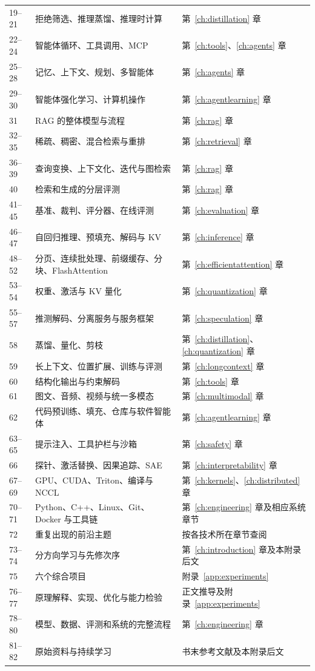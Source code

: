 \begin{longtable}{L{0.12\textwidth}L{0.45\textwidth}L{0.31\textwidth}}
19--21 & 拒绝筛选、推理蒸馏、推理时计算 & 第~\ref{ch:distillation} 章 \\
22--24 & 智能体循环、工具调用、MCP & 第~\ref{ch:tools}、\ref{ch:agents} 章 \\
25--28 & 记忆、上下文、规划、多智能体 & 第~\ref{ch:agents} 章 \\
29--30 & 智能体强化学习、计算机操作 & 第~\ref{ch:agentlearning} 章 \\
31 & RAG 的整体模型与流程 & 第~\ref{ch:rag} 章 \\
32--35 & 稀疏、稠密、混合检索与重排 & 第~\ref{ch:retrieval} 章 \\
36--39 & 查询变换、上下文化、迭代与图检索 & 第~\ref{ch:rag} 章 \\
40 & 检索和生成的分层评测 & 第~\ref{ch:rag} 章 \\
41--45 & 基准、裁判、评分器、在线评测 & 第~\ref{ch:evaluation} 章 \\
46--47 & 自回归推理、预填充、解码与 KV & 第~\ref{ch:inference} 章 \\
48--52 & 分页、连续批处理、前缀缓存、分块、FlashAttention & 第~\ref{ch:efficientattention} 章 \\
53--54 & 权重、激活与 KV 量化 & 第~\ref{ch:quantization} 章 \\
55--57 & 推测解码、分离服务与服务框架 & 第~\ref{ch:speculation} 章 \\
58 & 蒸馏、量化、剪枝 & 第~\ref{ch:distillation}、\ref{ch:quantization} 章 \\
59 & 长上下文、位置扩展、训练与评测 & 第~\ref{ch:longcontext} 章 \\
60 & 结构化输出与约束解码 & 第~\ref{ch:tools} 章 \\
61 & 图文、音频、视频与统一多模态 & 第~\ref{ch:multimodal} 章 \\
62 & 代码预训练、填充、仓库与软件智能体 & 第~\ref{ch:agentlearning} 章 \\
63--65 & 提示注入、工具护栏与沙箱 & 第~\ref{ch:safety} 章 \\
66 & 探针、激活替换、因果追踪、SAE & 第~\ref{ch:interpretability} 章 \\
67--69 & GPU、CUDA、Triton、编译与 NCCL & 第~\ref{ch:kernels}、\ref{ch:distributed} 章 \\
70--71 & Python、C++、Linux、Git、Docker 与工具链 & 第~\ref{ch:engineering} 章及相应系统章节 \\
72 & 重复出现的前沿主题 & 按各技术所在章节查阅 \\
73--74 & 分方向学习与先修次序 & 第~\ref{ch:introduction} 章及本附录后文 \\
75 & 六个综合项目 & 附录~\ref{app:experiments} \\
76--77 & 原理解释、实现、优化与能力检验 & 正文推导及附录~\ref{app:experiments} \\
78--80 & 模型、数据、评测和系统的完整流程 & 第~\ref{ch:engineering} 章 \\
81--82 & 原始资料与持续学习 & 书末参考文献及本附录后文 \\
\end{longtable}

